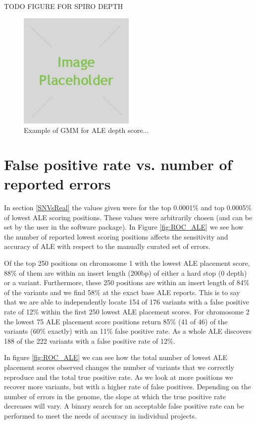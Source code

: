 \documentclass[phd,tocprelim]{cornell}
\begin{document}
TODO
FIGURE FOR SPIRO DEPTH
\begin{figure}[hpt]
 	\centerline{\includegraphics[width=0.5\textwidth]{figures/placeholder.jpg}}
    \caption[Example of GMM for ALE depth score]{Example of GMM for ALE depth score...}
 	\label{fig:GMM_spiro}
\end{figure}

\section{False positive rate vs. number of reported errors}
\label{ROCALE}

In section \ref{SNVsReal} the values given were for the top 0.0001\% and top 0.0005\% of lowest ALE scoring positions. These values were arbitrarily chosen (and can be set by the user in the software package). In Figure \ref{fig:ROC_ALE} we see how the number of reported lowest scoring positions affects the sensitivity and accuracy of ALE with respect to the manually curated set of errors.

Of the top 250 positions on chromosome 1 with the lowest ALE placement score, 88\% of
them are within an insert length (200bp) of either a hard stop (0 depth) or a variant. Furthermore,
these 250 positions are within an insert length of 84\% of the variants and we find 58\% at the
exact base ALE reports. This is to say that we are able to independently locate 154 of 176
variants with a false positive rate of 12\% within the first 250 lowest ALE placement scores. For
chromosome 2 the lowest 75 ALE placement score positions return 85\% (41 of 46) of the variants
(60\% exactly) with an 11\% false positive rate. As a whole ALE discovers 188 of the 222 variants
with a false positive rate of 12\%.

In figure \ref{fig:ROC_ALE} we can see how the total number of lowest ALE placement scores observed
changes the number of variants that we correctly reproduce and the total true positive rate. As
we look at more positions we recover more variants, but with a higher rate of false positives.
Depending on the number of errors in the genome, the slope at which the true positive rate
decreases will vary. A binary search for an acceptable false positive rate can be performed to
meet the needs of accuracy in individual projects.
\end{document}
